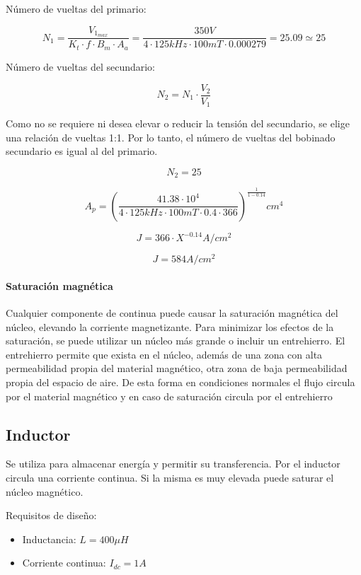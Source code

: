 Número de vueltas del primario:

$$ N_{1}=\frac{V_{1_{max}}}{K_{t}\cdot f\cdot B_{m}\cdot A_{a}}=\frac{350V}{4\cdot 125kHz\cdot 100mT\cdot 0.000279}=25.09\simeq 25 $$

Número de vueltas del secundario: 

$$ N_{2}=N_{1}\cdot\frac{V_{2}}{V_{1}} $$

Como no se requiere ni desea elevar o reducir la tensión del secundario, se elige una relación de vueltas 1:1. 
Por lo tanto, el número de vueltas del bobinado secundario es igual al del primario. 

$$ N_{2}=25 $$

$$ A_{p}=\left(\frac{41.38\cdot 10^{4}}{4\cdot 125kHz\cdot 100mT\cdot 0.4\cdot 366}\right)^{\frac{1}{1-0.14}} {cm}^4 $$

$$ J=366\cdot X^{-0.14} A/{cm}^2 $$

$$ J=584 A/{cm}^2 $$

\paragraph{Saturación magnética}

Cualquier componente de continua puede causar la saturación magnética del núcleo, 
elevando la corriente magnetizante. 
Para minimizar los efectos de la saturación, se puede utilizar un núcleo más grande o incluir un entrehierro.
El entrehierro permite que exista en el núcleo, además de una zona con alta permeabilidad propia del material magnético, 
otra zona de baja permeabilidad propia del espacio de aire. 
De esta forma en condiciones normales el flujo circula por el material magnético y en caso de saturación circula por el entrehierro 

\subsection{Inductor}

Se utiliza para almacenar energía y permitir su transferencia. 
Por el inductor circula una corriente continua. Si la misma es muy elevada puede saturar el núcleo magnético. 

Requisitos de diseño: 

\begin{itemize}
    \item Inductancia: $L=400\mu H$
    \item Corriente continua: $I_{dc}=1A$
\end{itemize}

